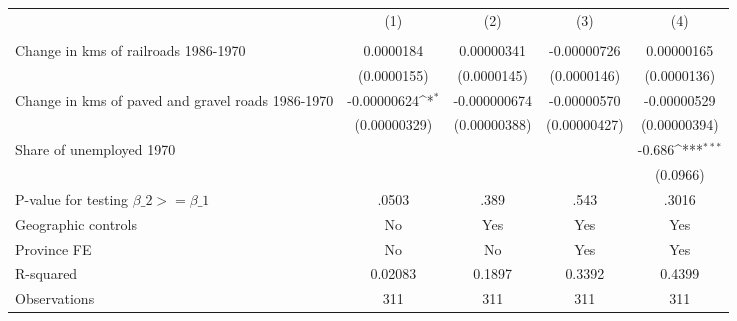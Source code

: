 {
\def\sym#1{\ifmmode^{#1}\else\(^{#1}\)\fi}
\begin{tabular}{l*{4}{c}}
\hline\hline
                &\multicolumn{1}{c}{(1)}&\multicolumn{1}{c}{(2)}&\multicolumn{1}{c}{(3)}&\multicolumn{1}{c}{(4)}\\
                &\multicolumn{1}{c}{}&\multicolumn{1}{c}{}&\multicolumn{1}{c}{}&\multicolumn{1}{c}{}\\
\hline
Change in kms of railroads 1986-1970&0.0000184         &0.00000341         &-0.00000726         &0.00000165         \\
                &(0.0000155)         &(0.0000145)         &(0.0000146)         &(0.0000136)         \\
[1em]
Change in kms of paved and gravel roads 1986-1970&-0.00000624\sym{*}  &-0.000000674         &-0.00000570         &-0.00000529         \\
                &(0.00000329)         &(0.00000388)         &(0.00000427)         &(0.00000394)         \\
[1em]
Share of unemployed 1970&                  &                  &                  &   -0.686\sym{***}\\
                &                  &                  &                  & (0.0966)         \\
\hline
P-value for testing $\beta\_{2} >= \beta\_{1}$&    .0503         &     .389         &     .543         &    .3016         \\
Geographic controls&       No         &      Yes         &      Yes         &      Yes         \\
Province FE     &       No         &       No         &      Yes         &      Yes         \\
R-squared       &  0.02083         &   0.1897         &   0.3392         &   0.4399         \\
Observations    &      311         &      311         &      311         &      311         \\
\hline\hline
\end{tabular}
}
